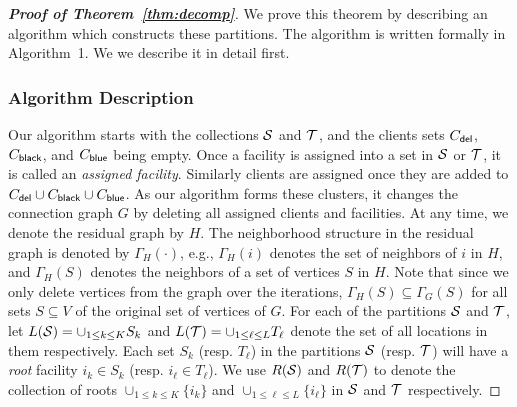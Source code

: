 \begin{proof}[{\bf Proof of Theorem~\ref{thm:decomp}}]
We prove this theorem by describing an algorithm which constructs these partitions.
The algorithm is written formally in Algorithm~1. We
we describe it in detail first.

\subsubsection{Algorithm Description}
Our algorithm starts with the collections ${\cal S}$ and ${\cal T}$, and the clients sets $C_{\mathsf{del}}$, $C_{\mathsf{black}}$, and $C_{\mathsf{blue}}$ being empty. Once a facility is assigned into a set in ${\cal S}$ or ${\cal T}$, it is called an \emph{assigned facility}. Similarly clients are assigned once they are added to $C_{\mathsf{del}} \cup C_{\mathsf{black}} \cup C_{\mathsf{blue}}$.
As our algorithm forms these clusters, it changes the connection graph $G$ by deleting all assigned clients and facilities. At any time, we denote the residual graph by $H$. The neighborhood structure in the residual graph is denoted by $\Gamma_H(\cdot)$, e.g., $\Gamma_H(i)$ denotes the set of neighbors of $i$ in $H$, and $\Gamma_H(S)$ denotes the neighbors of a set of vertices $S$ in $H$. Note that since we only delete vertices from the graph over the iterations, $\Gamma_H(S) \subseteq \Gamma_G(S)$ for all sets $S \subseteq V$ of the original set of vertices of $G$. For each of the partitions ${\cal S}$ and ${\cal T}$, let $L({\cal S}) = \cup_{1\leq k \leq K} S_k$ and $L({\cal T}) = \cup_{1 \leq \ell \leq L} T_\ell$ denote the set of all locations in them respectively.
Each set $S_k$ (resp. $T_\ell$) in the partitions ${\cal S}$ (resp. ${\cal T}$) will have a {\em root} facility $i_k \in S_k$ (resp. $i_\ell \in T_\ell$). We use $R({\cal S})$ and $R({\cal T})$ to denote the collection of roots $\cup_{1 \leq k \leq K} \{i_k\}$ and $\cup_{1 \leq \ell \leq L} \{i_\ell\}$ in ${\cal S}$ and ${\cal T}$ respectively.




\end{proof}
